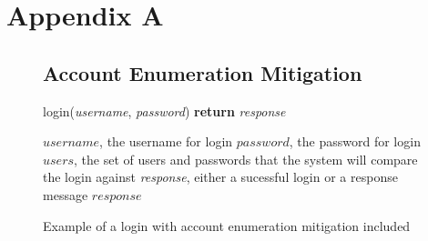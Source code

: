 \documentclass{ueacmpstyle}
\begin{document}
    
    

	
	
	\newpage
	
	\appendix
        \section{Appendix A}\label{app:A}   %

            \begin{figure}[ht]
              \subsection{Account Enumeration Mitigation}
              \label{sec:account-enumeration}
              \centering
              \begin{algorithm}[H]
              \caption{login(\emph{username}, \emph{password}) {\bf return} \emph{response}}
                \begin{algorithmic}[1]
                  \Require $username$, the username for login
                  \Require $password$, the password for login
                  \Require $users$, the set of users and passwords that the system will 
                            compare the login against
                  \Ensure \emph{response}, either a sucessful login or a response message
                      \Else
                      \EndIf
                    \Else
                    \EndIf
                  \EndFor
                  \State \Return $response$
                \end{algorithmic}
              \end{algorithm}
              \caption{Example of a login with account enumeration mitigation included}
              \label{fig:account-enumeration}
          \end{figure}
\end{document}
